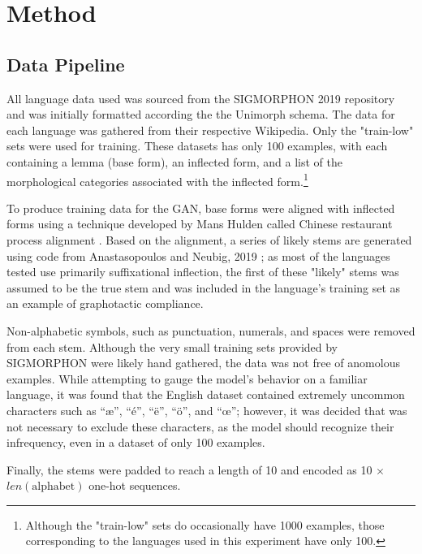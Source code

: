 \documentclass{article}
\begin{document}
  \section{Method}
    \subsection{Data Pipeline}
      All language data used was sourced from the SIGMORPHON 2019 repository and was initially formatted according the the Unimorph schema. The data for each language was gathered from their respective Wikipedia. Only the "train-low" sets were used for training. These datasets has only 100 examples, with each containing a lemma (base form), an inflected form, and a list of the morphological categories associated with the inflected form.\footnote{Although the "train-low" sets do occasionally have 1000 examples, those corresponding to the languages used in this experiment have only 100.} 
    
      To produce training data for the GAN, base forms were aligned with inflected forms using a technique developed by Mans Hulden called Chinese restaurant process alignment \cite{crpalign}. Based on the alignment, a series of likely stems are generated using code from Anastasopoulos and Neubig, 2019 \cite{CMU}; as most of the languages tested use primarily suffixational inflection, the first of these "likely" stems was assumed to be the true stem and was included in the language's training set as an example of graphotactic compliance.

      Non-alphabetic symbols, such as punctuation, numerals, and spaces were removed from each stem. Although the very small training sets provided by SIGMORPHON were likely hand gathered, the data was not free of anomolous examples. While attempting to gauge the model's behavior on a familiar language, it was found that the English dataset contained extremely uncommon characters such as ``æ'', ``é'', ``ë'', ``ö'', and ``œ''; however, it was decided that was not necessary to exclude these characters, as the model should recognize their infrequency, even in a dataset of only 100 examples.

      Finally, the stems were padded to reach a length of 10 and encoded as 10 $\times$ $len(\textrm{alphabet})$ one-hot sequences.
\end{document}

